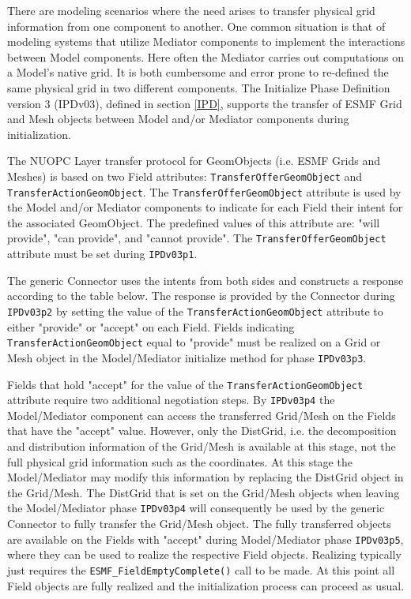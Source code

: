 %

\label{TransferGeom}

There are modeling scenarios where the need arises to transfer physical grid information from one component to another. One common situation is that of modeling systems that utilize Mediator components to implement the interactions between Model components. Here often the Mediator carries out computations on a Model's native grid. It is both cumbersome and error prone to re-defined the same physical grid in two different components. The Initialize Phase Definition version 3 (IPDv03), defined in section \ref{IPD}, supports the transfer of ESMF Grid and Mesh objects between Model and/or Mediator components during initialization.

The NUOPC Layer transfer protocol for GeomObjects (i.e. ESMF Grids and Meshes) is based on two Field attributes: {\tt TransferOfferGeomObject} and {\tt TransferActionGeomObject}. The {\tt TransferOfferGeomObject} attribute is used by the Model and/or Mediator components to indicate for each Field their intent for the associated GeomObject. The predefined values of this attribute are: "will provide", "can provide", and "cannot provide". The {\tt TransferOfferGeomObject} attribute must be set during {\tt IPDv03p1}.

The generic Connector uses the intents from both sides and constructs a response according to the table below. The response is provided by the Connector during {\tt IPDv03p2} by setting the value of the {\tt TransferActionGeomObject} attribute to either "provide" or "accept" on each Field. Fields indicating {\tt TransferActionGeomObject} equal to "provide" must be realized on a Grid or Mesh object in the Model/Mediator initialize method for phase {\tt IPDv03p3}.

Fields that hold "accept" for the value of the {\tt TransferActionGeomObject} attribute require two additional negotiation steps. By {\tt IPDv03p4} the Model/Mediator component can access the transferred Grid/Mesh on the Fields that have the "accept" value. However, only the DistGrid, i.e. the decomposition and distribution information of the Grid/Mesh is available at this stage, not the full physical grid information such as the coordinates. At this stage the Model/Mediator may modify this information by replacing the DistGrid object in the Grid/Mesh. The DistGrid that is set on the Grid/Mesh objects when leaving the Model/Mediator phase {\tt IPDv03p4} will consequently be used by the generic Connector to fully transfer the Grid/Mesh object. The fully transferred objects are available on the Fields with "accept" during Model/Mediator phase {\tt IPDv03p5}, where they can be used to realize the respective Field objects. Realizing typically just requires the {\tt ESMF\_FieldEmptyComplete()} call to be made. At this point all Field objects are fully realized and the initialization process can proceed as usual.

